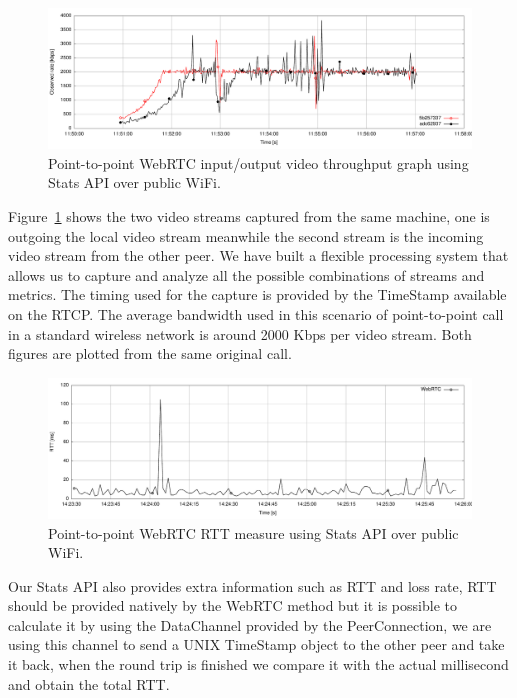  \begin{figure}[h]
  \centering
    \includegraphics[width=1\textwidth]{./figures/onetooneWiFIStatsVideoStreams.pdf}
      \caption[Point-to-point WebRTC input/output video throughput graph using Stats API over public WiFi]{Point-to-point WebRTC input/output video throughput graph using Stats API over public WiFi.}
	\label{fig:onetooneWifiRTCVideoStreams}
\end{figure}

Figure~\ref{fig:onetooneWifiRTCVideoStreams} shows the two video streams captured from the same machine, one is outgoing the local video stream meanwhile the second stream is the incoming video stream from the other peer. We have built a flexible processing system that allows us to capture and analyze all the possible combinations of streams and metrics. The timing used for the capture is provided by the TimeStamp available on the RTCP. The average bandwidth used in this scenario of point-to-point call in a standard wireless network is around 2000 Kbps per video stream. Both figures are plotted from the same original call.

 \begin{figure}[h]
  \centering
    \includegraphics[width=1\textwidth]{./figures/p2prttexample.pdf}
      \caption[Point-to-point WebRTC RTT measure using Stats API over public WiFi]{Point-to-point WebRTC RTT measure using Stats API over public WiFi.}
	\label{fig:p2prttexample}
\end{figure}

Our Stats API also provides extra information such as RTT and loss rate, RTT should be provided natively by the WebRTC method but it is possible to calculate it by using the DataChannel provided by the PeerConnection, we are using this channel to send a UNIX TimeStamp object to the other peer and take it back, when the round trip is finished we compare it with the actual millisecond and obtain the total RTT.

